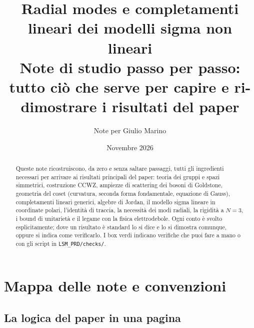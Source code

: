 \documentclass[11pt,a4paper]{article}
\title{\textbf{Radial modes e completamenti lineari dei modelli sigma non lineari}\\[4pt]
\large Note di studio passo per passo: tutto ciò che serve per capire e ri-dimostrare i risultati del paper}
\author{Note per Giulio Marino}
\date{Novembre 2026}
\numberwithin{equation}{section}
\theoremstyle{remark}
\begin{document}
\maketitle

\begin{abstract}
Queste note ricostruiscono, da zero e senza saltare passaggi, tutti gli ingredienti necessari per arrivare ai risultati principali del paper: teoria dei gruppi e spazi simmetrici, costruzione CCWZ, ampiezze di scattering dei bosoni di Goldstone, geometria del coset (curvatura, seconda forma fondamentale, equazione di Gauss), completamenti lineari generici, algebre di Jordan, il modello sigma lineare in coordinate polari, l'identità di traccia, la necessità dei modi radiali, la rigidità a $N=3$, i bound di unitarietà e il legame con la fisica elettrodebole. Ogni conto è svolto esplicitamente; dove un risultato è standard lo si dice e lo si dimostra comunque, oppure si indica come verificarlo. I box verdi indicano verifiche che puoi fare a mano o con gli script in \texttt{LSM\_PRD/checks/}.
\end{abstract}

\tableofcontents
\newpage

\section{Mappa delle note e convenzioni}

\subsection{La logica del paper in una pagina}
\end{document}
